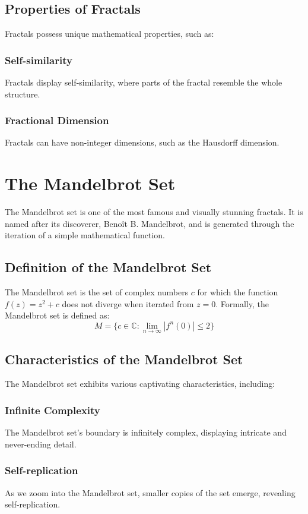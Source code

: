 \documentclass{article}
\begin{document}
\subsection{Properties of Fractals}
Fractals possess unique mathematical properties, such as:

\subsubsection{Self-similarity}
Fractals display self-similarity, where parts of the fractal resemble the whole structure.

\subsubsection{Fractional Dimension}
Fractals can have non-integer dimensions, such as the Hausdorff dimension.

\section{The Mandelbrot Set}
The Mandelbrot set is one of the most famous and visually stunning fractals. It is named after its discoverer, Benoît B. Mandelbrot, and is generated through the iteration of a simple mathematical function.

\subsection{Definition of the Mandelbrot Set}
The Mandelbrot set is the set of complex numbers $c$ for which the function $f(z) = z^2 + c$ does not diverge when iterated from $z = 0$. Formally, the Mandelbrot set is defined as:
\[ M = \{ c \in \mathbb{C} : \lim_{n\to\infty} |f^n(0)| \leq 2 \} \]

\subsection{Characteristics of the Mandelbrot Set}
The Mandelbrot set exhibits various captivating characteristics, including:

\subsubsection{Infinite Complexity}
The Mandelbrot set's boundary is infinitely complex, displaying intricate and never-ending detail.

\subsubsection{Self-replication}
As we zoom into the Mandelbrot set, smaller copies of the set emerge, revealing self-replication.
\end{document}
